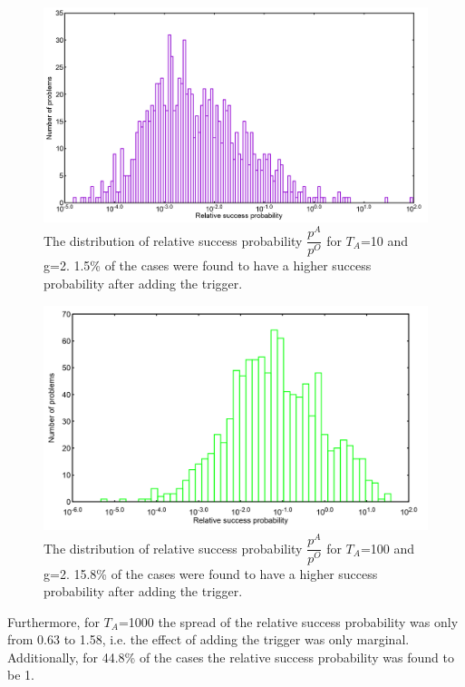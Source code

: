 \documentclass[../main.tex]{subfiles}
\begin{document}
\begin{figure}[H]
\centering 
\includegraphics[scale=0.21]{A_T10_g2.png}
\caption{The distribution of relative success probability $\dfrac{p^A}{p^O}$ for $T_A$=10 and g=2. 1.5\% of the cases were found to have a higher success probability after adding the trigger.}
\label{fig:a37}
\end{figure}
\begin{figure}[H]
\centering 
\includegraphics[scale=0.21]{A_T100_g2.png}
\caption{The distribution of relative success probability $\dfrac{p^A}{p^O}$ for $T_A$=100 and g=2. 15.8\% of the cases were found to have a higher success probability after adding the trigger. }
\label{fig:a38}
\end{figure}
Furthermore, for $T_A$=1000 the spread of the relative success probability was only from 0.63 to 1.58, i.e. the effect of adding the trigger was only marginal. Additionally, for 44.8\% of the cases the relative success probability was found to be 1.
\end{document}
